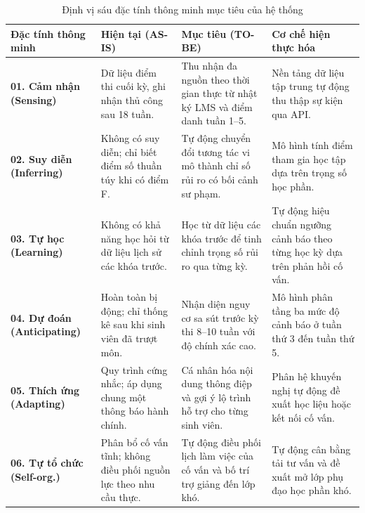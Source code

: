 \begin{table}[htbp]
\centering
\caption{Định vị sáu đặc tính thông minh mục tiêu của hệ thống}
\label{tab:dinh_vi_thong_minh}
\vspace{0.2cm}
\begin{tabularx}{\textwidth}{|L{2.8cm}|Y|Y|Y|}
\hline
\textbf{Đặc tính thông minh} & \textbf{Hiện tại (AS-IS)} & \textbf{Mục tiêu (TO-BE)} & \textbf{Cơ chế hiện thực hóa} \\
\hline
\textbf{01. Cảm nhận (Sensing)} & Dữ liệu điểm thi cuối kỳ, ghi nhận thủ công sau 18 tuần. & Thu nhận đa nguồn theo thời gian thực từ nhật ký LMS và điểm danh tuần 1--5. & Nền tảng dữ liệu tập trung tự động thu thập sự kiện qua API. \\
\hline
\textbf{02. Suy diễn (Inferring)} & Không có suy diễn; chỉ biết điểm số thuần túy khi có điểm F. & Tự động chuyển đổi tương tác vi mô thành chỉ số rủi ro có bối cảnh sư phạm. & Mô hình tính điểm tham gia học tập dựa trên trọng số học phần. \\
\hline
\textbf{03. Tự học (Learning)} & Không có khả năng học hỏi từ dữ liệu lịch sử các khóa trước. & Học từ dữ liệu các khóa trước để tinh chỉnh trọng số rủi ro qua từng kỳ. & Tự động hiệu chuẩn ngưỡng cảnh báo theo từng học kỳ dựa trên phản hồi cố vấn. \\
\hline
\textbf{04. Dự đoán (Anticipating)} & Hoàn toàn bị động; chỉ thống kê sau khi sinh viên đã trượt môn. & Nhận diện nguy cơ sa sút trước kỳ thi 8--10 tuần với độ chính xác cao. & Mô hình phân tầng ba mức độ cảnh báo ở tuần thứ 3 đến tuần thứ 5. \\
\hline
\textbf{05. Thích ứng (Adapting)} & Quy trình cứng nhắc; áp dụng chung một thông báo hành chính. & Cá nhân hóa nội dung thông điệp và gợi ý lộ trình hỗ trợ cho từng sinh viên. & Phân hệ khuyến nghị tự động đề xuất học liệu hoặc kết nối cố vấn. \\
\hline
\textbf{06. Tự tổ chức (Self-org.)} & Phân bổ cố vấn tĩnh; không điều phối nguồn lực theo nhu cầu thực. & Tự động điều phối lịch làm việc của cố vấn và bố trí trợ giảng đến lớp khó. & Tự động cân bằng tải tư vấn và đề xuất mở lớp phụ đạo học phần khó. \\
\hline
\end{tabularx}
\end{table}

